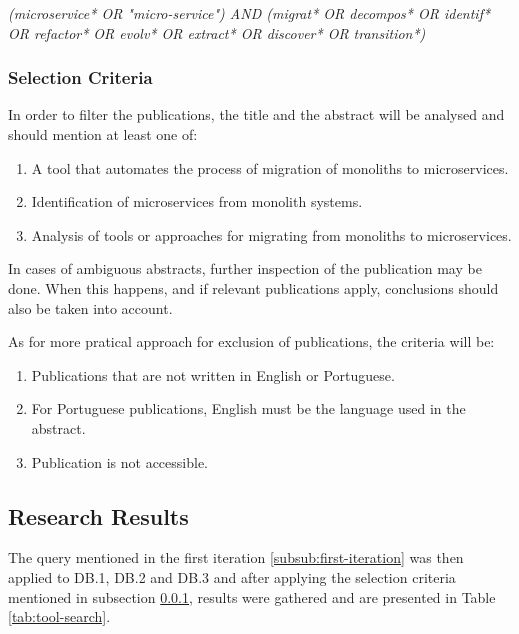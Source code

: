\documentclass[conference]{IEEEtran}
\begin{document}
\begin{center}
  \emph{(microservice* OR "micro-service") AND (migrat* OR decompos* OR
  identif* OR refactor* OR evolv* OR extract* OR discover* OR transition*)}
\end{center}

\subsubsection{Selection Criteria} \label{sub:selection-criteria}

In order to filter the publications, the title and the abstract will be
analysed and should mention at least one of:

\begin{enumerate}[{IC}1.]
  \item A tool that automates the process of migration of monoliths to
    microservices.
  \item Identification of microservices from monolith systems.
  \item Analysis of tools or approaches for migrating from monoliths to
    microservices.
\end{enumerate}

In cases of ambiguous abstracts, further inspection of the publication may be
done. When this happens, and if relevant publications apply, conclusions should
also be taken into account.

As for more pratical approach for exclusion of publications, the criteria will
be:

\begin{enumerate}[{EC}1.]
  \item Publications that are not written in English or Portuguese.
  \item For Portuguese publications, English must be the language used in the
    abstract.
  \item Publication is not accessible.
\end{enumerate}

\subsection{Research Results}

The query mentioned in the first iteration \ref{subsub:first-iteration} was
then applied to DB.1, DB.2 and DB.3 and after applying the selection criteria
mentioned in subsection \ref{sub:selection-criteria}, results were gathered and
are presented in Table \ref{tab:tool-search}.
\end{document}

